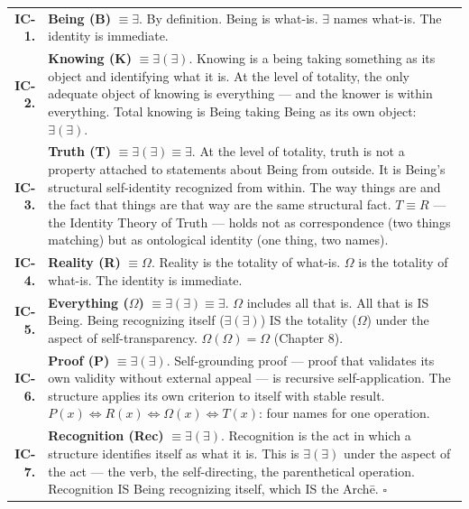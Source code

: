 \documentclass[10pt, openany, oneside]{book}
\renewcommand{\footnotesize}{\fontsize{8.5}{11}\selectfont}
\begin{document}
{\footnotesize
\noindent\begin{tabular}{r p{}}
\textbf{IC-1.} & \textbf{Being (B)} $\equiv \exists$. By definition. Being is what-is. $\exists$ names what-is. The identity is immediate. \\[0.5em]

\textbf{IC-2.} & \textbf{Knowing (K)} $\equiv \exists(\exists)$. Knowing is a being taking something as its object and identifying what it is. At the level of totality, the only adequate object of knowing is everything --- and the knower is within everything. Total knowing is Being taking Being as its own object: $\exists(\exists)$. \\[0.5em]

\textbf{IC-3.} & \textbf{Truth (T)} $\equiv \exists(\exists) \equiv \exists$. At the level of totality, truth is not a property attached to statements about Being from outside. It is Being's structural self-identity recognized from within. The way things are and the fact that things are that way are the same structural fact. $T \equiv R$ --- the Identity Theory of Truth --- holds not as correspondence (two things matching) but as ontological identity (one thing, two names). \\[0.5em]

\textbf{IC-4.} & \textbf{Reality (R)} $\equiv \Omega$. Reality is the totality of what-is. $\Omega$ is the totality of what-is. The identity is immediate. \\[0.5em]

\textbf{IC-5.} & \textbf{Everything ($\Omega$)} $\equiv \exists(\exists) \equiv \exists$. $\Omega$ includes all that is. All that is IS Being. Being recognizing itself ($\exists(\exists)$) IS the totality ($\Omega$) under the aspect of self-transparency. $\Omega(\Omega) = \Omega$ (Chapter 8). \\[0.5em]

\textbf{IC-6.} & \textbf{Proof (P)} $\equiv \exists(\exists)$. Self-grounding proof --- proof that validates its own validity without external appeal --- is recursive self-application. The structure applies its own criterion to itself with stable result. $P(x) \iff R(x) \iff \Omega(x) \iff T(x)$: four names for one operation. \\[0.5em]

\textbf{IC-7.} & \textbf{Recognition (Rec)} $\equiv \exists(\exists)$. Recognition is the act in which a structure identifies itself as what it is. This is $\exists(\exists)$ under the aspect of the act --- the verb, the self-directing, the parenthetical operation. Recognition IS Being recognizing itself, which IS the Arch\={e}. $\square$ \\[0.5em]
\end{tabular}
}
\end{document}

